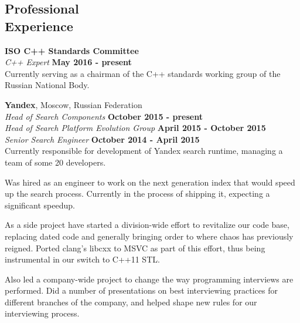 \documentclass[margin,line]{CV}
\begin{document}
\begin{resume}
    
    
    \section{\mysidestyle Professional\\Experience}
    \textbf{ISO C++ Standards Committee} \vspace{2mm}\\\vspace{1mm}%
    \textsl{C++ Expert} \hfill \textbf{May 2016 - present}\\\vspace{1mm}%
    Currently serving as a chairman of the C++ standards working group of the Russian National Body.
   
    
    \textbf{Yandex}, Moscow, Russian Federation \vspace{2mm}\\\vspace{1mm}%
    \textsl{Head of Search Components} \hfill \textbf{October 2015 - present}\\\vspace{1mm}%
    \textsl{Head of Search Platform Evolution Group} \hfill \textbf{April 2015 - October 2015}\\\vspace{1mm}%
    \textsl{Senior Search Engineer} \hfill \textbf{October 2014 - April 2015}\\
    Currently responsible for development of Yandex search runtime, managing a team of some 20 developers.
    
    Was hired as an engineer to work on the next generation index that would speed up the search process. Currently in the process of shipping it, expecting a significant speedup.

    As a side project have started a division-wide effort to revitalize our code base, replacing dated code and generally bringing order to where chaos has previously reigned. Ported clang's libcxx to MSVC as part of this effort, thus being instrumental in our switch to C++11 STL.

    Also led a company-wide project to change the way programming interviews are performed. Did a number of presentations on best interviewing practices for different branches of the company, and helped shape new rules for our interviewing process.


\end{resume}
\end{document}
